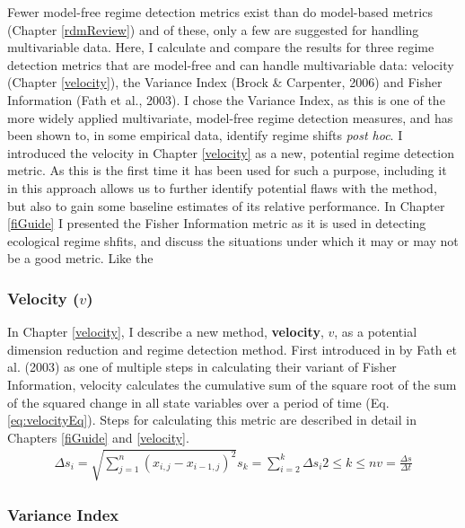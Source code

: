 \documentclass[12pt,twoside,openany]{reedthesis}
\begin{document}
Fewer model-free regime detection metrics exist than do model-based metrics (Chapter \ref{rdmReview}) and of these, only a few are suggested for handling multivariable data. Here, I calculate and compare the results for three regime detection metrics that are model-free and can handle multivariable data: velocity (Chapter \ref{velocity}), the Variance Index (Brock \& Carpenter, 2006) and Fisher Information (Fath et al., 2003). I chose the Variance Index, as this is one of the more widely applied multivariate, model-free regime detection measures, and has been shown to, in some empirical data, identify regime shifts \emph{post hoc}. I introduced the velocity in Chapter \ref{velocity} as a new, potential regime detection metric. As this is the first time it has been used for such a purpose, including it in this approach allows us to further identify potential flaws with the method, but also to gain some baseline estimates of its relative performance. In Chapter \ref{fiGuide} I presented the Fisher Information metric as it is used in detecting ecological regime shfits, and discuss the situations under which it may or may not be a good metric. Like the

\hypertarget{velocity-v}{%
\subsubsection{\texorpdfstring{Velocity (\(v\))}{Velocity (v)}}\label{velocity-v}}

In Chapter \ref{velocity}, I describe a new method, \textbf{velocity}, \(v\), as a potential dimension reduction and regime detection method. First introduced in by Fath et al. (2003) as one of multiple steps in calculating their variant of Fisher Information, velocity calculates the cumulative sum of the square root of the sum of the squared change in all state variables over a period of time (Eq. \eqref{eq:velocityEq}). Steps for calculating this metric are described in detail in Chapters \ref{fiGuide} and \ref{velocity}.
\begin{equation}
\begin{array}{rcr}
\Delta s_i = \sqrt{\sum_{j=1}^{n} (x_{i,j} -x_{i-1, j})^2}
s_k =  \sum_{i=2}^{k}\Delta{s_i}
2\leq k \leq n
v =\frac{\Delta s}{\Delta t}  
\end{array}
\label{eq:velocityEq}
\end{equation}
\hypertarget{variance-index}{%
\subsubsection{Variance Index}\label{variance-index}}
\end{document}
